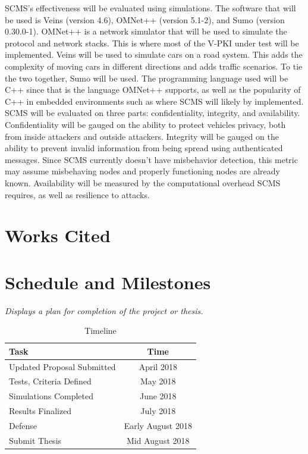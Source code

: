 \documentclass {article}
\newcommand{\sechint}[1]{\small{\emph{#1}} \bigskip}
\begin{document}
SCMS's effectiveness will be evaluated using simulations. The software that will be used is Veins (version 4.6), OMNet++ (version 5.1-2), and Sumo (version 0.30.0-1). OMNet++ is a network simulator that will be used to simulate the protocol and network stacks. This is where most of the V-PKI under test will be implemented. Veins will be used to simulate cars on a road system. This adds the complexity of moving cars in different directions and adds traffic scenarios. To tie the two together, Sumo will be used.
The programming language used will be C++ since that is the language OMNet++ supports, as well as the popularity of C++ in embedded environments such as where SCMS will likely by implemented. SCMS will be evaluated on three parts: confidentiality, integrity, and availability. Confidentiality will be gauged on the ability to protect vehicles privacy, both from inside attackers and outside attackers. Integrity will be gauged on the ability to prevent invalid information from being spread using authenticated messages. Since SCMS currently doesn't have misbehavior detection, this metric may assume misbehaving nodes and properly functioning nodes are already known. Availability will be measured by the computational overhead SCMS requires, as well as resilience to attacks.

\pagebreak
\section{Works Cited}
\printbibliography[title={\ }]

\pagebreak
\section{Schedule and Milestones}{\sechint{Displays a plan for completion of the project or thesis.}}

\begin{table}[!ht]
	\centering
	\begin{tabular}{l|c}
		\hline
		Task & Time \\ \hline \hline
		Updated Proposal Submitted & April 2018 \\ \hline
		Tests, Criteria Defined & May 2018 \\ \hline
		Simulations Completed & June 2018 \\ \hline
		Results Finalized & July 2018 \\ \hline
		Defense & Early August 2018 \\ \hline
		Submit Thesis & Mid August 2018 \\ \hline
	\end{tabular}
	\caption{Timeline}
\end{table}
\end{document}
